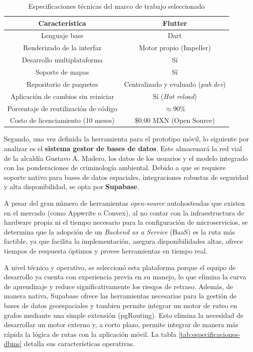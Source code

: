 \begin{table}[htbp]
\centering
\footnotesize
\caption{Especificaciones técnicas del marco de trabajo seleccionado}
\label{tab:especificaciones-framework}
\begin{tabularx}{\textwidth}{ |C|C| }
\hline
\textbf{Característica} & \textbf{Flutter} \\ \hline
Lenguaje base & Dart \cite{flutter_businessvalue} \\ \hline
Renderizado de la interfaz & Motor propio (Impeller) \cite{flutter_businessvalue} \\ \hline
Desarrollo multiplataforma & Sí \cite{flutter_businessvalue} \\ \hline
Soporte de mapas & Sí \cite{pub_dev} \\ \hline
Repositorio de paquetes & Centralizado y evaluado (\textit{pub.dev}) \cite{pub_dev} \\ \hline
Aplicación de cambios sin reiniciar & Sí (\textit{Hot reload}) \cite{flutter_businessvalue} \\ \hline
Porcentaje de reutilización de código & $\approx$90\% \cite{suri2022cross} \\ \hline
Costo de licenciamiento (10 meses) & \$0.00 MXN (Open Source) \\ \hline
\end{tabularx}
\end{table}

Segundo, una vez definida la herramienta para el prototipo móvil, lo siguiente por analizar es el \textbf{sistema gestor de bases de datos}. Este almacenará la red vial de la alcaldía Gustavo A. Madero, los datos de los usuarios y el modelo integrado con las ponderaciones de criminología ambiental. Debido a que se requiere soporte nativo para bases de datos espaciales, integraciones robustas de seguridad y alta disponibilidad, se opta por \textbf{Supabase}.

A pesar del gran número de herramientas \textit{open-source} autohosteadas que existen en el mercado (como Appwrite o Convex), al no contar con la infraestructura de hardware propia ni el tiempo necesario para la configuración de microservicios, se determina que la adopción de un \textit{Backend as a Service} (BaaS) es la ruta más factible, ya que facilita la implementación, asegura disponibilidades altas, ofrece tiempos de respuesta óptimos y provee herramientas en tiempo real.

A nivel técnico y operativo, se seleccionó esta plataforma porque el equipo de desarrollo ya cuenta con experiencia previa en su manejo, lo que elimina la curva de aprendizaje y reduce significativamente los riesgos de retraso. Además, de manera nativa, Supabase ofrece las herramientas necesarias para la gestión de bases de datos geoespaciales y tambien permite integrar un motor de ruteo en grafos mediante una simple extensión (pgRouting). Esto elimina la necesidad de desarrollar un motor externo y, a corto plazo, permite integrar de manera más rápida la lógica de rutas con la aplicación móvil. La tabla \ref{tab:especificaciones-dbms} detalla sus características operativas.

